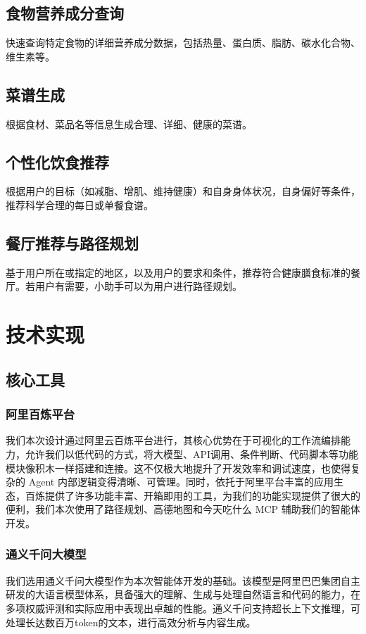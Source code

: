 \documentclass[a4paper,UTF8]{ctexart}
\begin{document}
\subsection{食物营养成分查询}
快速查询特定食物的详细营养成分数据，包括热量、蛋白质、脂肪、碳水化合物、维生素等。
\subsection{菜谱生成}
根据食材、菜品名等信息生成合理、详细、健康的菜谱。
\subsection{个性化饮食推荐}
根据用户的目标（如减脂、增肌、维持健康）和自身身体状况，自身偏好等条件，推荐科学合理的每日或单餐食谱。
\subsection{餐厅推荐与路径规划}
基于用户所在或指定的地区，以及用户的要求和条件，推荐符合健康膳食标准的餐厅。若用户有需要，小助手可以为用户进行路径规划。


\section{技术实现}
\subsection{核心工具}
\subsubsection{阿里百炼平台}
我们本次设计通过阿里云百炼平台进行，其核心优势在于可视化的工作流编排能力，允许我们以低代码的方式，将大模型、API调用、条件判断、代码脚本等功能模块像积木一样搭建和连接。这不仅极大地提升了开发效率和调试速度，也使得复杂的 Agent 内部逻辑变得清晰、可管理。同时，依托于阿里平台丰富的应用生态，百炼提供了许多功能丰富、开箱即用的工具，为我们的功能实现提供了很大的便利，我们本次使用了路径规划、高德地图和今天吃什么 MCP 辅助我们的智能体开发。
\subsubsection{通义千问大模型}
我们选用通义千问大模型作为本次智能体开发的基础。该模型是阿里巴巴集团自主研发的大语言模型体系，具备强大的理解、生成与处理自然语言和代码的能力，在多项权威评测和实际应用中表现出卓越的性能。通义千问支持超长上下文推理，可处理长达数百万token的文本，进行高效分析与内容生成。
\end{document}
